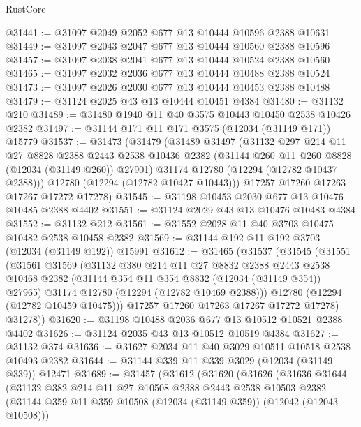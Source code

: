 \begin{lexlean}{RustCore}
\begin{coremodule}
@31441 := @31097 @2049 @2052 @677 @13 @10444 @10596 @2388 @10631
@31449 := @31097 @2043 @2047 @677 @13 @10444 @10560 @2388 @10596
@31457 := @31097 @2038 @2041 @677 @13 @10444 @10524 @2388 @10560
@31465 := @31097 @2032 @2036 @677 @13 @10444 @10488 @2388 @10524
@31473 := @31097 @2026 @2030 @677 @13 @10444 @10453 @2388 @10488
@31479 := @31124 @2025 @43 @13 @10444 @10451 @4384
@31480 := @31132 @210
@31489 := @31480 @1940 @11 @40 @3575 @10443 @10450 @2538 @10426 @2382
@31497 := @31144 @171 @11 @171 @3575 (@12034 (@31149 @171)) @15779
@31537 := @31473
    (@31479
      (@31489
        @31497
        (@31132
          @297
          @214
          @11
          @27
          @8828
          @2388
          @2443
          @2538
          @10436
          @2382
          (@31144 @260 @11 @260 @8828 (@12034 (@31149 @260)) @27901)
          @31174
          @12780
          (@12294 (@12782 @10437 @2388)))
        @12780
        (@12294 (@12782 @10427 @10443)))
      @17257
      @17260
      @17263
      @17267
      @17272
      @17278)
@31545 := @31198 @10453 @2030 @677 @13 @10476 @10485 @2388 @4402
@31551 := @31124 @2029 @43 @13 @10476 @10483 @4384
@31552 := @31132 @212
@31561 := @31552 @2028 @11 @40 @3703 @10475 @10482 @2538 @10458 @2382
@31569 := @31144 @192 @11 @192 @3703 (@12034 (@31149 @192)) @15991
@31612 := @31465
    (@31537
      (@31545
        (@31551
          (@31561
            @31569
            (@31132
              @380
              @214
              @11
              @27
              @8832
              @2388
              @2443
              @2538
              @10468
              @2382
              (@31144 @354 @11 @354 @8832 (@12034 (@31149 @354)) @27965)
              @31174
              @12780
              (@12294 (@12782 @10469 @2388)))
            @12780
            (@12294 (@12782 @10459 @10475)))
          @17257
          @17260
          @17263
          @17267
          @17272
          @17278)
        @31278))
@31620 := @31198 @10488 @2036 @677 @13 @10512 @10521 @2388 @4402
@31626 := @31124 @2035 @43 @13 @10512 @10519 @4384
@31627 := @31132 @374
@31636 := @31627 @2034 @11 @40 @3029 @10511 @10518 @2538 @10493 @2382
@31644 := @31144 @339 @11 @339 @3029 (@12034 (@31149 @339)) @12471
@31689 := @31457
    (@31612
      (@31620
        (@31626
          (@31636
            @31644
            (@31132
              @382
              @214
              @11
              @27
              @10508
              @2388
              @2443
              @2538
              @10503
              @2382
              (@31144 @359 @11 @359 @10508 (@12034 (@31149 @359)) (@12042 (@12043 @10508)))

\end{coremodule}
\end{lexlean}
